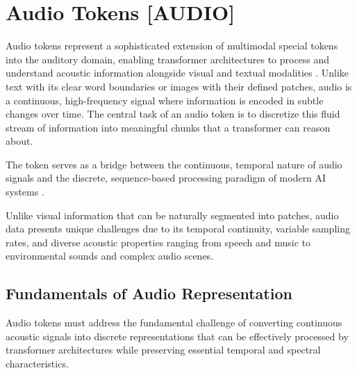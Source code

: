 
\section{Audio Tokens [AUDIO]}

Audio tokens represent a sophisticated extension of multimodal special tokens into the auditory domain, enabling transformer architectures to process and understand acoustic information alongside visual and textual modalities \citep{baevski2020wav2vec, akbari2021vatt}. Unlike text with its clear word boundaries or images with their defined patches, audio is a continuous, high-frequency signal where information is encoded in subtle changes over time. The central task of an audio token is to discretize this fluid stream of information into meaningful chunks that a transformer can reason about.

The  token serves as a bridge between the continuous, temporal nature of audio signals and the discrete, sequence-based processing paradigm of modern AI systems \citep{borsos2023audiolm, huang2023audiogpt}.

\begin{comment}
Feedback: This is a strong start. To immediately frame the core challenge, you could add: "Unlike text with its clear word boundaries or images with their defined patches, audio is a continuous, high-frequency signal where information is encoded in subtle changes over time. The central task of an audio token is to discretize this fluid stream of information into meaningful chunks that a transformer can reason about."

STATUS: addressed - added explanation of the core challenge of audio tokenization and its differences from text and images
\end{comment}

Unlike visual information that can be naturally segmented into patches, audio data presents unique challenges due to its temporal continuity, variable sampling rates, and diverse acoustic properties ranging from speech and music to environmental sounds and complex audio scenes.

\subsection{Fundamentals of Audio Representation}

Audio tokens must address the fundamental challenge of converting continuous acoustic signals into discrete representations that can be effectively processed by transformer architectures while preserving essential temporal and spectral characteristics.

